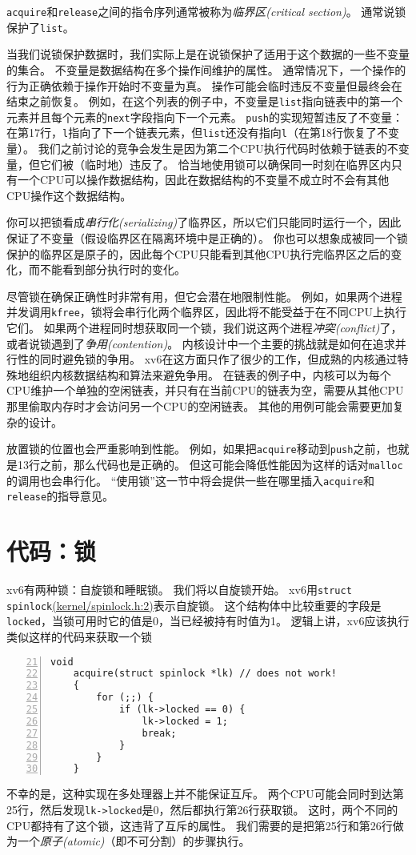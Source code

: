 \texttt{acquire}和\texttt{release}之间的指令序列通常被称为\emph{临界区(critical section)}。
通常说锁保护了\texttt{list}。

当我们说锁保护数据时，我们实际上是在说锁保护了适用于这个数据的一些不变量的集合。
不变量是数据结构在多个操作间维护的属性。
通常情况下，一个操作的行为正确依赖于操作开始时不变量为真。
操作可能会临时违反不变量但最终会在结束之前恢复。
例如，在这个列表的例子中，不变量是\texttt{list}指向链表中的第一个元素并且每个元素的\texttt{next}字段指向下一个元素。
\texttt{push}的实现短暂违反了不变量：在第17行，\texttt{l}指向了下一个链表元素，但\texttt{list}还没有指向\texttt{l}（在第18行恢复了不变量）。
我们之前讨论的竞争会发生是因为第二个CPU执行代码时依赖于链表的不变量，但它们被（临时地）违反了。
恰当地使用锁可以确保同一时刻在临界区内只有一个CPU可以操作数据结构，因此在数据结构的不变量不成立时不会有其他CPU操作这个数据结构。

你可以把锁看成\emph{串行化(serializing)}了临界区，所以它们只能同时运行一个，因此保证了不变量（假设临界区在隔离环境中是正确的）。
你也可以想象成被同一个锁保护的临界区是原子的，因此每个CPU只能看到其他CPU执行完临界区之后的变化，而不能看到部分执行时的变化。

尽管锁在确保正确性时非常有用，但它会潜在地限制性能。
例如，如果两个进程并发调用\texttt{kfree}，锁将会串行化两个临界区，因此将不能受益于在不同CPU上执行它们。
如果两个进程同时想获取同一个锁，我们说这两个进程\emph{冲突(conflict)}了，或者说锁遇到了\emph{争用(contention)}。
内核设计中一个主要的挑战就是如何在追求并行性的同时避免锁的争用。
xv6在这方面只作了很少的工作，但成熟的内核通过特殊地组织内核数据结构和算法来避免争用。
在链表的例子中，内核可以为每个CPU维护一个单独的空闲链表，并只有在当前CPU的链表为空，需要从其他CPU那里偷取内存时才会访问另一个CPU的空闲链表。
其他的用例可能会需要更加复杂的设计。

放置锁的位置也会严重影响到性能。
例如，如果把\texttt{acquire}移动到\texttt{push}之前，也就是13行之前，那么代码也是正确的。
但这可能会降低性能因为这样的话对\texttt{malloc}的调用也会串行化。
“使用锁”这一节中将会提供一些在哪里插入\texttt{acquire}和\texttt{release}的指导意见。

\section{代码：锁}
xv6有两种锁：自旋锁和睡眠锁。
我们将以自旋锁开始。
xv6用\texttt{struct spinlock}\href{https://github.com/mit-pdos/xv6-riscv/blob/risc/kernel/spinlock.h#L2}{(kernel/spinlock.h:2)}表示自旋锁。
这个结构体中比较重要的字段是\texttt{locked}，当锁可用时它的值是0，当已经被持有时值为1。
逻辑上讲，xv6应该执行类似这样的代码来获取一个锁
\begin{lstlisting}[numbers=left,firstnumber=21]
    void
    acquire(struct spinlock *lk) // does not work!
    {
        for (;;) {
            if (lk->locked == 0) {
                lk->locked = 1;
                break;
            }
        }
    }
\end{lstlisting}
不幸的是，这种实现在多处理器上并不能保证互斥。
两个CPU可能会同时到达第25行，然后发现\texttt{lk->locked}是0，然后都执行第26行获取锁。
这时，两个不同的CPU都持有了这个锁，这违背了互斥的属性。
我们需要的是把第25行和第26行做为一个\emph{原子(atomic)}（即不可分割）的步骤执行。

